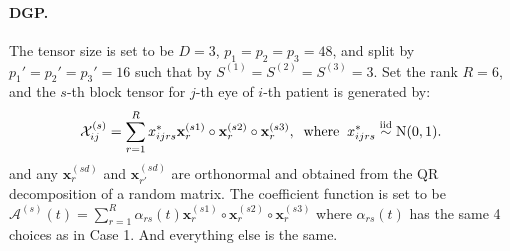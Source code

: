 \documentclass[10pt]{notes}
\begin{document}
\paragraph*{DGP.}
The tensor size is set to be $D=3$, $p_1=p_2=p_3=48$, and split by $p_1'=p_2'=p_3'=16$ such that by $S^{(1)}=S^{(2)}=S^{(3)}=3$. Set the rank $R=6$, and the $s$-th block tensor for $j$-th eye of $i$-th patient is generated by:
\begin{align*}
    \mathcal{X}_{ij}^{(s)}=\sum_{r=1}^{R}x^*_{ijrs}\mathbf{x}_{r}^{(s1)}\circ\mathbf{x}_{r}^{(s2)}\circ\mathbf{x}_{r}^{(s3)},
    \;\;\text{where}\;\;
    x_{ijrs}^*\mathrel{\overset{\mathrm{iid}}{\sim}} \mathrm{N}(0,1).
\end{align*}
and any $\mathbf{x}_{r}^{(sd)}$ and $\mathbf{x}_{r'}^{(sd)}$ are orthonormal and obtained from the QR decomposition of a random matrix. The coefficient function is set to be $\mathcal{A}^{(s)}(t)=\sum_{r=1}^{R} \alpha_{rs}(t)\mathbf{x}_r^{(s1)}\circ \mathbf{x}_r^{(s2)}\circ\mathbf{x}_{r}^{(s3)}$ where $\alpha_{rs}(t)$ has the same 4 choices as in Case 1. And everything else is the same.

\end{document}
